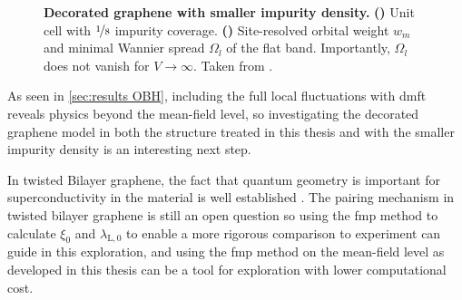 \documentclass[../main.tex]{subfiles}
\begin{document}
\begin{figure}[t]
\begin{subfigure}[t]{0.6\textwidth}
	\end{subfigure}
	\label{fig:decorated graphene extended unit cell}
	\caption[Decorated graphene with smaller impurity density.]{
		\textbf{Decorated graphene with smaller impurity density.} \textbf{()} Unit cell with \(\nicefrac{1}{8}\) impurity coverage. \textbf{()} Site-resolved orbital weight \(w_m\) and minimal Wannier spread \(\Omega_l\) of the flat band. Importantly, \(\Omega_l\) does not vanish for \(V \to \infty\). Taken from \cite{wittQuantumGeometryLocal2025}.
	}
\end{figure}

As seen in \cref{sec:results OBH}, including the full local fluctuations with \gls{dmft} reveals physics beyond the mean-field level, so investigating the decorated graphene model in both the structure treated in this thesis and with the smaller impurity density is an interesting next step.

In twisted Bilayer graphene, the fact that quantum geometry is important for superconductivity in the material is well established \cite{tanakaSuperfluidStiffnessMagicangle2025}.
The pairing mechanism in twisted bilayer graphene is still an open question so using the \gls{fmp} method to calculate \(\xi_0\) and \(\lambda_{\mathrm{L}, 0}\) to enable a more rigorous comparison to experiment can guide in this exploration, and using the \gls{fmp} method on the mean-field level as developed in this thesis can be a tool for exploration with lower computational cost.
\end{document}
